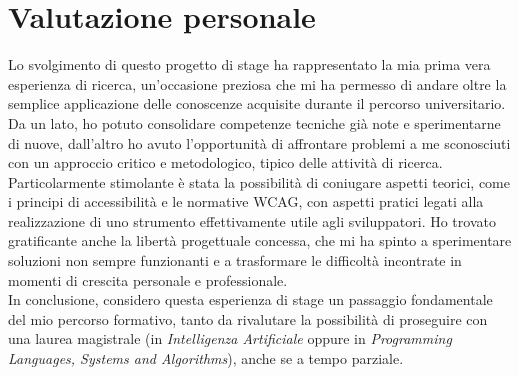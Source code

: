 \section{Valutazione personale}
\noindent Lo svolgimento di questo progetto di stage ha rappresentato la mia prima vera esperienza di ricerca, un’occasione preziosa che mi ha permesso di andare oltre la semplice applicazione delle conoscenze acquisite durante il percorso universitario. Da un lato, ho potuto consolidare competenze tecniche già note e sperimentarne di nuove, dall’altro ho avuto l’opportunità di affrontare problemi a me sconosciuti con un approccio critico e metodologico, tipico delle attività di ricerca. Particolarmente stimolante è stata la possibilità di coniugare aspetti teorici, come i principi di accessibilità e le normative WCAG, con aspetti pratici legati alla realizzazione di uno strumento effettivamente utile agli sviluppatori. Ho trovato gratificante anche la libertà progettuale concessa, che mi ha spinto a sperimentare soluzioni non sempre funzionanti e a trasformare le difficoltà incontrate in momenti di crescita personale e professionale. \\
In conclusione, considero questa esperienza di stage un passaggio fondamentale del mio percorso formativo, tanto da rivalutare la possibilità di proseguire con una laurea magistrale (in \textit{Intelligenza Artificiale} oppure in \textit{Programming Languages, Systems and Algorithms}), anche se a tempo parziale.